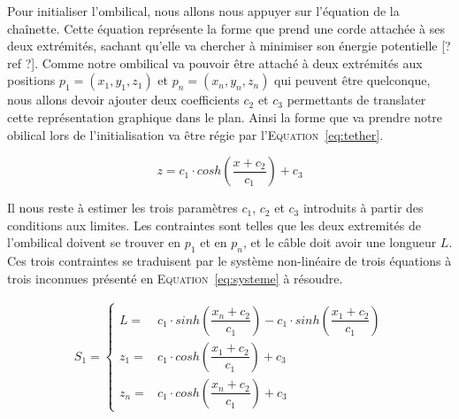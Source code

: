 				Pour initialiser l'ombilical, nous allons nous appuyer sur l'équation de la chaînette. Cette équation représente la forme que prend une corde attachée à ses deux extrémités, sachant qu'elle va chercher à minimiser son énergie potentielle [? ref ?]. Comme notre ombilical va pouvoir être attaché à deux extrémités aux positions $p_1 = (x_1, y_1, z_1)$ et $p_n = (x_n, y_n, z_n)$ qui peuvent être quelconque, nous allons devoir ajouter deux coefficients $c_2$ et $c_3$ permettants de translater cette représentation graphique dans le plan. Ainsi la forme que va prendre notre obilical lors de l'initialisation va être régie par l'\textsc{Equation}~\ref{eq:tether}.
			
				\begin{equation}
					z = c_1\cdot cosh\left(\frac{x + c_2}{c_1}\right) + c_3
					\label{eq:tether}
				\end{equation}
			
				Il nous reste à estimer les trois paramètres $c_1$, $c_2$ et $c_3$ introduits à partir des conditions aux limites. Les contraintes sont telles que les deux extremités de l'ombilical doivent se trouver en $p_1$ et en $p_n$, et le câble doit avoir une longueur $L$. Ces trois contraintes se traduisent par le système non-linéaire de trois équations à trois inconnues présenté en \textsc{Equation}~\ref{eq:systeme} à résoudre.
				
				\begin{align}
					S_1 = 
					\begin{cases}
						L   = & c_1 \cdot sinh\left(\dfrac{x_n+c_2}{c_1}\right) - c_1 \cdot sinh\left(\dfrac{x_1+c_2}{c_1}\right) \\
						z_1 = & c_1 \cdot cosh\left(\dfrac{x_1+c_2}{c_1}\right)+c_3 \\
						z_n = & c_1 \cdot cosh\left(\dfrac{x_n+c_2}{c_1}\right)+c_3
					\end{cases}
					\label{eq:systeme}
				\end{align}
			
